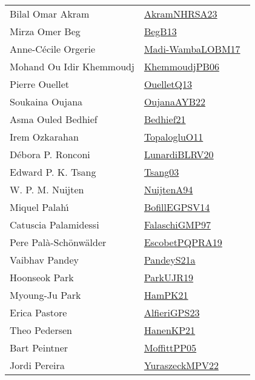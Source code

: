 {\begin{longtable}{p{4cm}p{20cm}}
Bilal Omar Akram & \href{articles/AkramNHRSA23.pdf}{AkramNHRSA23}~\cite{AkramNHRSA23}\\
Mirza Omer Beg & \href{}{BegB13}~\cite{BegB13}\\
Anne{-}C{\'{e}}cile Orgerie & \href{papers/Madi-WambaLOBM17.pdf}{Madi-WambaLOBM17}~\cite{Madi-WambaLOBM17}\\
Mohand Ou Idir Khemmoudj & \href{papers/KhemmoudjPB06.pdf}{KhemmoudjPB06}~\cite{KhemmoudjPB06}\\
Pierre Ouellet & \href{papers/OuelletQ13.pdf}{OuelletQ13}~\cite{OuelletQ13}\\
Soukaina Oujana & \href{papers/OujanaAYB22.pdf}{OujanaAYB22}~\cite{OujanaAYB22}\\
Asma Ouled Bedhief & \href{articles/Bedhief21.pdf}{Bedhief21}~\cite{Bedhief21}\\
Irem Ozkarahan & \href{articles/TopalogluO11.pdf}{TopalogluO11}~\cite{TopalogluO11}\\
D{\'{e}}bora P. Ronconi & \href{articles/LunardiBLRV20.pdf}{LunardiBLRV20}~\cite{LunardiBLRV20}\\
Edward P. K. Tsang & \href{articles/Tsang03.pdf}{Tsang03}~\cite{Tsang03}\\
W. P. M. Nuijten & \href{}{NuijtenA94}~\cite{NuijtenA94}\\
Miquel Palah{\'{\i}} & \href{papers/BofillEGPSV14.pdf}{BofillEGPSV14}~\cite{BofillEGPSV14}\\
Catuscia Palamidessi & \href{articles/FalaschiGMP97.pdf}{FalaschiGMP97}~\cite{FalaschiGMP97}\\
Pere Pal{\`{a}}{-}Sch{\"{o}}nw{\"{a}}lder & \href{articles/EscobetPQPRA19.pdf}{EscobetPQPRA19}~\cite{EscobetPQPRA19}\\
Vaibhav Pandey & \href{articles/PandeyS21a.pdf}{PandeyS21a}~\cite{PandeyS21a}\\
Hoonseok Park & \href{papers/ParkUJR19.pdf}{ParkUJR19}~\cite{ParkUJR19}\\
Myoung-Ju Park & \href{articles/HamPK21.pdf}{HamPK21}~\cite{HamPK21}\\
Erica Pastore & \href{articles/AlfieriGPS23.pdf}{AlfieriGPS23}~\cite{AlfieriGPS23}\\
Theo Pedersen & \href{papers/HanenKP21.pdf}{HanenKP21}~\cite{HanenKP21}\\
Bart Peintner & \href{papers/MoffittPP05.pdf}{MoffittPP05}~\cite{MoffittPP05}\\
Jordi Pereira & \href{articles/YuraszeckMPV22.pdf}{YuraszeckMPV22}~\cite{YuraszeckMPV22}\\

\end{longtable}}
